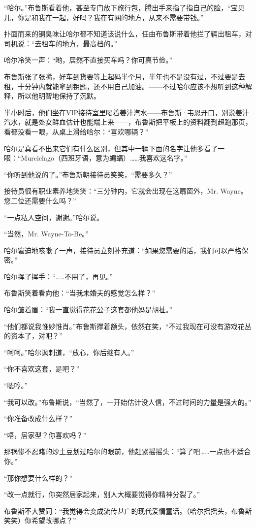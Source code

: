 \documentclass[../main]{subfiles}
\begin{document}
“哈尔。”布鲁斯看着他，甚至专门放下旅行包，腾出手来指了指自己的脸，“宝贝儿，你是和我在一起，好吗？我在有网的地方，从来不需要带钱。”

扑面而来的铜臭味让哈尔都不知道该说什么，任由布鲁斯带着他拦了辆出租车，对司机说：“去租车的地方，最高档的。”

哈尔冷笑一声：“哟，居然不直接买车吗？你可真节俭。”

布鲁斯张了张嘴，好车到货要等上起码半个月，半年也不是没有过，不过要是去租，十分钟内就能拿到钥匙，还不用自己加油。——不过哈尔应该不想听到这种解释，所以他明智地保持了沉默。

半小时后，他们坐在VIP接待室里喝着姜汁汽水——布鲁斯·韦恩开口，别说姜汁汽水，就是处女鲜血估计也能端上来——，布鲁斯把平板上的资料翻到超跑那页，看都没看一眼，从桌上滑给哈尔：“喜欢哪辆？”

哈尔是真看不出来它们有什么区别，但其中一辆下面的名字让他多看了一眼：“Murcielago（西班牙语，意为蝙蝠）……我喜欢这名字。”

“你听到他说的了。”布鲁斯朝接待员笑笑，“需要多久？”

接待员很有职业素养地笑笑：“三分钟内，它就会出现在这扇窗外，Mr.
Wayne。您二位还需要什么吗？”

“一点私人空间，谢谢。”哈尔说。

“当然，Mr. Wayne-To-Be。”

哈尔窘迫地咳嗽了一声，接待员立刻补充道：“如果您需要的话，我们可以严格保密。”

哈尔挥了挥手：“……不用了，再见。”

布鲁斯笑着看向他：“当我未婚夫的感觉怎么样？”

哈尔皱着眉：“我一直觉得花花公子这套都他妈是胡扯。”

“他们都说我惟妙惟肖。”布鲁斯撑着额头，依然在笑，“不过我现在可没有游戏花丛的资本了，对吧？”

“呵呵。”哈尔讽刺道，“放心，你后继有人。”

“你不喜欢这套，是吧？”

“嗯哼。”

“我可以改。”布鲁斯说，“当然了，一开始估计没人信，不过时间的力量是强大的。”

“你准备改成什么样？”

“唔，居家型？你喜欢吗？”

那锅惨不忍睹的炒土豆划过哈尔的眼前，他赶紧摇摇头：“算了吧……一点也不适合你。”

“那你想要什么样的？”

“改一点就行，你突然居家起来，别人大概要觉得你精神分裂了。”

布鲁斯不大赞同：“我觉得会变成流传甚广的现代爱情童话。（哈尔摇摇头，布鲁斯笑笑）你希望改哪点？”
\end{document}
